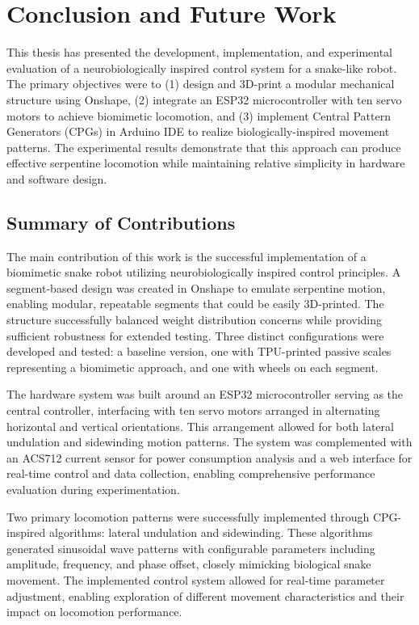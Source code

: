 \documentclass[12pt,a4paper]{report}
\begin{document}
\chapter{Conclusion and Future Work}
\label{ch:conclusion}

This thesis has presented the development, implementation, and experimental evaluation of a neurobiologically inspired control system for a snake-like robot. The primary objectives were to (1) design and 3D-print a modular mechanical structure using Onshape, (2) integrate an ESP32 microcontroller with ten servo motors to achieve biomimetic locomotion, and (3) implement Central Pattern Generators (CPGs) in Arduino IDE to realize biologically-inspired movement patterns. The experimental results demonstrate that this approach can produce effective serpentine locomotion while maintaining relative simplicity in hardware and software design.

\section{Summary of Contributions}
\label{sec:contribution}

The main contribution of this work is the successful implementation of a biomimetic snake robot utilizing neurobiologically inspired control principles. A segment-based design was created in Onshape to emulate serpentine motion, enabling modular, repeatable segments that could be easily 3D-printed. The structure successfully balanced weight distribution concerns while providing sufficient robustness for extended testing. Three distinct configurations were developed and tested: a baseline version, one with TPU-printed passive scales representing a biomimetic approach, and one with wheels on each segment.

The hardware system was built around an ESP32 microcontroller serving as the central controller, interfacing with ten servo motors arranged in alternating horizontal and vertical orientations. This arrangement allowed for both lateral undulation and sidewinding motion patterns. The system was complemented with an ACS712 current sensor for power consumption analysis and a web interface for real-time control and data collection, enabling comprehensive performance evaluation during experimentation.

Two primary locomotion patterns were successfully implemented through CPG-inspired algorithms: lateral undulation and sidewinding. These algorithms generated sinusoidal wave patterns with configurable parameters including amplitude, frequency, and phase offset, closely mimicking biological snake movement. The implemented control system allowed for real-time parameter adjustment, enabling exploration of different movement characteristics and their impact on locomotion performance.
\end{document}
